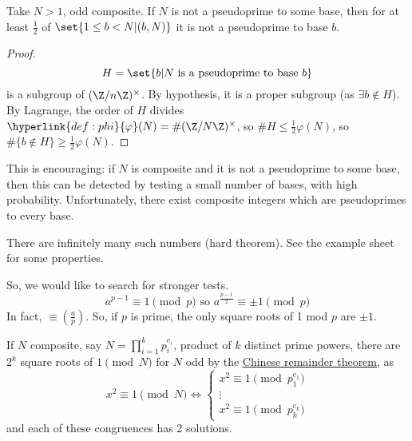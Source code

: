 \documentclass{article}
\newcommand{\legendre}[2]{\genfrac{(}{)}{}{}{#1}{#2}}
\begin{document}
\begin{nprop}\label{prop:7.1}
    Take $N>1$, odd composite.
    If $N$ is not a pseudoprime to some base, then for at least $\frac{1}{2}$ of $\set{1 \leq b < N | (b, N)}$ it is not a pseudoprime to base $b$.
\end{nprop}
\begin{proof}
    \begin{equation*}
        H = \set{b | N \text{ is a pseudoprime to base } b}
    \end{equation*}
    is a subgroup of $(\Z/n\Z)^\times$. By hypothesis, it is a proper subgroup (as $\exists b \notin H$).
    By Lagrange, the order of $H$ divides $\hyperlink{def:phi}{\varphi}(N) = \# (\Z/N\Z)^\times$, so $\#H \leq \frac{1}{2} \varphi(N)$, so $\#\{b \notin H\} \geq \frac{1}{2} \varphi(N)$.
\end{proof}

This is encouraging: if $N$ is composite and it is not a pseudoprime to some base, then this can be detected by testing a small number of bases, with high probability.
Unfortunately, there exist composite integers which are pseudoprimes to every base.


\begin{fact}
    There are infinitely many such numbers (hard theorem). See the example sheet for some properties.
\end{fact}

So, we would like to search for stronger tests.
\begin{equation*}
    a^{p-1} \equiv 1 \pmod{p} \text{ so } a^{\frac{p-1}{2}} \equiv \pm 1 \pmod{p}
\end{equation*}
In fact, $\equiv \legendre{a}{p}$.
So, if $p$ is prime, the only square roots of 1 mod $p$ are $\pm 1$.

If $N$ composite, say $N = \prod_{i=1}^k p_i^{e_i}$, product of $k$ distinct prime powers, there are $2^k$ square roots of $1 \pmod{N}$ for $N$ odd by the \hyperlink{thm:crt}{Chinese remainder theorem}, as
\begin{equation*}
    x^2 \equiv 1 \pmod{N} \iff
    \begin{cases}
        x^2 \equiv 1 \pmod{p_1^{e_1}} \\
        \vdots \\
        x^2 \equiv 1 \pmod{p_k^{e_k}}
    \end{cases}
\end{equation*}
and each of these congruences has 2 solutions.
\end{document}
